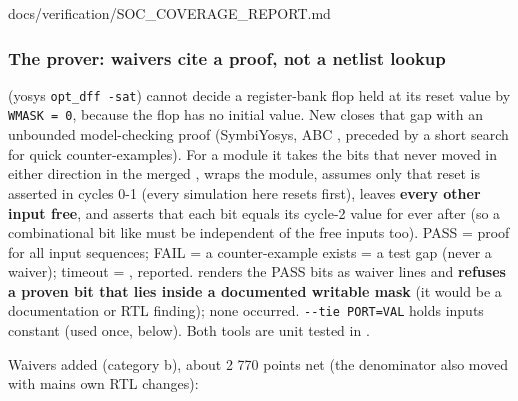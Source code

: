 \begin{relocated}{docs/verification/SOC_COVERAGE_REPORT.md}
\subsubsection{The prover: waivers cite a proof, not a netlist lookup}\label{tm:flow:soc-coverage-report:the-prover-waivers-cite-a-proof-not-a-netlist-lookup}

 (yosys
\texttt{opt\_\allowbreak{}dff\ -\allowbreak{}sat}) cannot decide a
register-bank flop held at its reset value by
\texttt{WMASK\ =\allowbreak{}\ 0}, because the flop has no initial
value. New  closes that gap with
an unbounded model-checking proof (SymbiYosys, ABC , preceded
by a short  search for quick counter-examples). For a module
it takes the bits that never moved in either direction in the merged
, wraps the module, assumes only that reset is asserted in
cycles 0-1 (every simulation here resets first), leaves \textbf{every
other input free}, and asserts that each bit equals its cycle-2 value
for ever after (so a combinational bit like  must be
independent of the free inputs too). PASS = proof for all input
sequences; FAIL = a counter-example exists = a test gap (never a
waiver); timeout = , reported.
 renders the PASS bits as waiver
lines and \textbf{refuses a proven bit that lies inside a documented
writable mask} (it would be a documentation or RTL finding); none
occurred.
\texttt{-\allowbreak{}-\allowbreak{}tie\ PORT=\allowbreak{}VAL} holds
inputs constant (used once, below). Both tools are unit tested in
.

Waivers added (category b), about 2 770 points net (the denominator also
moved with main\textquotesingle s own RTL changes):

{\footnotesize\setlength{\tabcolsep}{3pt}

}
\end{relocated}
